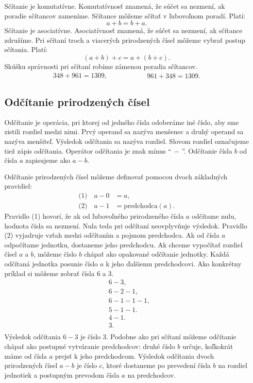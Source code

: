 \documentclass{report}
\begin{document}
Sčítanie je komutatívne. Komutatívnosť znamená, že súčet sa nezmení, ak poradie sčítancov zameníme. Sčítance môžeme sčítať v ľubovoľnom poradí. Platí:
\[
a + b = b + a.
\]
Sčítanie je asociatívne. Asociatívnosť znamená, že súčet sa nezmení, ak sčítance združíme. Pri sčítaní troch a viacerých prirodzených čísel môžeme vybrať postup sčítania. Platí:
\[
(a + b) + c = a + (b + c).
\]
Skúšku správnosti pri sčítaní robíme zámenou poradia sčítancov.
\[
\begin{aligned}
  348 + 961 = 1309,
\end{aligned}
\hspace{5em}
\begin{aligned}
  961 + 348 = 1309.
\end{aligned}
\]

\subsection{Odčítanie prirodzených čísel}

Odčítanie je operácia, pri ktorej od jedného čísla odoberáme iné číslo, aby sme zistili rozdiel medzi nimi. Prvý operand sa nazýva menšenec a druhý operand sa nazýva menšiteľ. Výsledok odčítania sa nazýva rozdiel. Slovom rozdiel označujeme tiež zápis odčítania. Operátor odčítania je znak mínus \enquote{\(\, - \,\)}. Odčítanie čísla \(b\) od čísla \(a\) zapisujeme ako \(a - b\).

Odčítanie prirodzených čísel môžeme definovať pomocou dvoch základných pravidiel:
\[
\begin{aligned}
  \text{(1)}\quad a - 0 &= a, \\
  \text{(2)}\quad a - 1 &= \text{predchodca}(a).
\end{aligned}
\]
Pravidlo (1) hovorí, že ak od ľubovoľného prirodzeného čísla \(a\) odčítame nulu, hodnota čísla sa nezmení. Nula teda pri odčítaní neovplyvňuje výsledok. Pravidlo (2) vyjadruje vzťah medzi odčítaním a pojmom predchodca. Ak od čísla \(a\) odpočítame jednotku, dostaneme jeho predchodcu. Ak chceme vypočítať rozdiel čísel \(a\) a \(b\), môžeme číslo \(b\) chápať ako opakované odčítanie jednotky. Každá odčítaná jednotka posunie číslo \(a\) k jeho ďalšiemu predchodcovi. Ako konkrétny príklad si môžeme zobrať čísla \(6\) a \(3\).
\[
\begin{aligned}
  &6 - 3, \\
  &6 - 2 - 1, \\
  &6 - 1 - 1 - 1, \\
  &5 - 1 - 1. \\
  &4 - 1. \\
  &3. \\
\end{aligned}
\]
Výsledok odčítania \(6 - 3\) je číslo \(3\). Podobne ako pri sčítaní môžeme odčítanie chápať ako postupné vytváranie predchodcov: druhé číslo \(b\) určuje, koľkokrát máme od čísla \(a\) prejsť k jeho predchodcom. Výsledok odčítania dvoch prirodzených čísel \(a - b\) je číslo \(c\), ktoré dostaneme po prevedení čísla \(b\) na rozdiel jednotiek a postupným prevodom čísla \(a\) na predchodcov.
\end{document}
